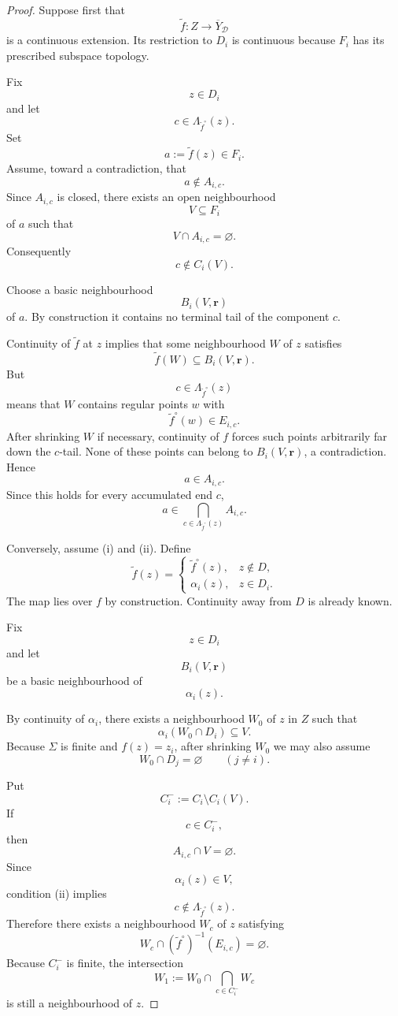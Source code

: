 \documentclass[10pt,a4paper]{amsart}
\begin{document}
\begin{proof}
Suppose first that
\[
\widetilde f:Z\to\overline Y_{\mathcal D}
\]
is a continuous extension.  Its restriction to $D_i$ is continuous
because $F_i$ has its prescribed subspace topology.

Fix
\[
z\in D_i
\]
and let
\[
c\in\Lambda_{\widetilde f^\circ}(z).
\]
Set
\[
a:=\widetilde f(z)\in F_i.
\]
Assume, toward a contradiction, that
\[
a\notin A_{i,c}.
\]
Since $A_{i,c}$ is closed, there exists an open neighbourhood
\[
V\subseteq F_i
\]
of $a$ such that
\[
V\cap A_{i,c}=\varnothing.
\]
Consequently
\[
c\notin C_i(V).
\]

Choose a basic neighbourhood
\[
B_i(V,\mathbf r)
\]
of $a$.  By construction it contains no terminal tail of the component
$c$.

Continuity of $\widetilde f$ at $z$ implies that some neighbourhood
$W$ of $z$ satisfies
\[
\widetilde f(W)
\subseteq
B_i(V,\mathbf r).
\]
But
\[
c\in\Lambda_{\widetilde f^\circ}(z)
\]
means that $W$ contains regular points $w$ with
\[
\widetilde f^\circ(w)\in E_{i,c}.
\]
After shrinking $W$ if necessary, continuity of $f$ forces such points
arbitrarily far down the $c$-tail.  None of these points can belong to
$B_i(V,\mathbf r)$, a contradiction.  Hence
\[
a\in A_{i,c}.
\]
Since this holds for every accumulated end $c$,
\[
a\in
\bigcap_{c\in\Lambda_{\widetilde f^\circ}(z)}
A_{i,c}.
\]

Conversely, assume (i) and (ii).  Define
\[
\widetilde f(z)
=
\begin{cases}
\widetilde f^\circ(z),
&
z\notin D,
\\[1mm]
\alpha_i(z),
&
z\in D_i.
\end{cases}
\]
The map lies over $f$ by construction.  Continuity away from $D$ is
already known.

Fix
\[
z\in D_i
\]
and let
\[
B_i(V,\mathbf r)
\]
be a basic neighbourhood of
\[
\alpha_i(z).
\]

By continuity of $\alpha_i$, there exists a neighbourhood $W_0$ of $z$
in $Z$ such that
\[
\alpha_i(W_0\cap D_i)\subseteq V.
\]
Because $\Sigma$ is finite and $f(z)=z_i$, after shrinking $W_0$ we may also
assume
\[
W_0\cap D_j=\varnothing
\qquad (j\neq i).
\]

Put
\[
C_i^-:=C_i\setminus C_i(V).
\]
If
\[
c\in C_i^-,
\]
then
\[
A_{i,c}\cap V=\varnothing.
\]
Since
\[
\alpha_i(z)\in V,
\]
condition (ii) implies
\[
c\notin\Lambda_{\widetilde f^\circ}(z).
\]
Therefore there exists a neighbourhood $W_c$ of $z$ satisfying
\[
W_c\cap
(\widetilde f^\circ)^{-1}(E_{i,c})
=
\varnothing.
\]
Because $C_i^-$ is finite, the intersection
\[
W_1
:=
W_0\cap
\bigcap_{c\in C_i^-}W_c
\]
is still a neighbourhood of $z$.


\end{proof}
\end{document}
